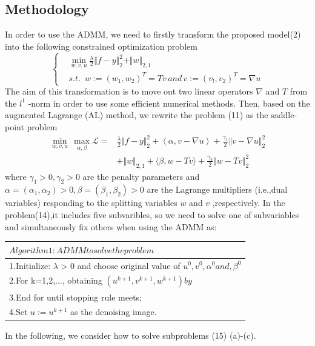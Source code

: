 \documentclass[hyperref]{ctexart}
\begin{document}
{\begin{multicols}{2}
		\subsection{Methodology}
			In order to use the ADMM, we need to firstly transform the proposed model(2) into the following constrained optimization problem
			\begin{equation}\left\{
				\begin{split}
					& \mathop{\min}_{w,v,u} \frac{\lambda}{2}\Vert f-y \Vert_{2}^{2} + \Vert w \Vert_{2,1} \\
					& s.t. \, \, \, w:=(w_1,w_2)^T = Tv \, and \, v:=(v_!,v_2)^T = \nabla u
				\end{split}
				\right.
			\end{equation}
			The aim of this transformation is to move out two linear operators $\nabla$ and $T$ from the $l^1$ -norm in order to use some efficient numerical methods. Then, based on the augmented Lagrange (AL) method, we rewrite the  problem (11) as the saddle-point problem
			\begin{equation}
				\begin{split}
					 \mathop{\min}_{w,v,u} \, \mathop{\max}_{\alpha,\beta} \mathscr{L}= & \frac{\lambda}{2}\Vert f-y \Vert_{2}^{2} +	\left \langle \alpha,v - \nabla u \right \rangle + \frac{\gamma_1}{2}\Vert v-\nabla u  \Vert_{2}^{2} \\
					 &+\Vert w \Vert_{2,1} + \langle \beta,w - Tv  \rangle + \frac{\gamma_2}{2}\Vert w-Tv \Vert_{2}^{2} 
				\end{split}
			\end{equation}
		where $\gamma_1>0,\gamma_2>0$ are the penalty parameters and $\alpha = (\alpha_1,\alpha_2)>0,\beta = (\beta_1,\beta_2)>0$ are the Lagrange multipliers (i.e.,dual variables) responding to the splitting variables $w$ and $v$ ,respectively. In the problem(14),it includes five subvaribles, so we need to solve one of subvariables and simultaneously fix others when using the ADMM as:
		 
		\begin{tabular}{l}
			\hline
			$Algorithm 1: ADMM to solve the problem $\\
		\hline
			1.Initialize: $\lambda$ > 0  and choose original value of  $u^0 , v^0,\alpha ^0 and,\beta^0 $ \\
			2.For k=1,2,...,  obtaining  $(u^{k+1}, v^{k+1}, w^{k+1})by$ \\
			3.End for until stopping rule meets;\\ 
			4.Set $u:= u^{k+1}$ as the denoising image.\\
			\hline
		\end{tabular}
		In the following, we consider how to solve subproblems (15) (a)-(c).
		

\end{multicols}}
\end{document}
